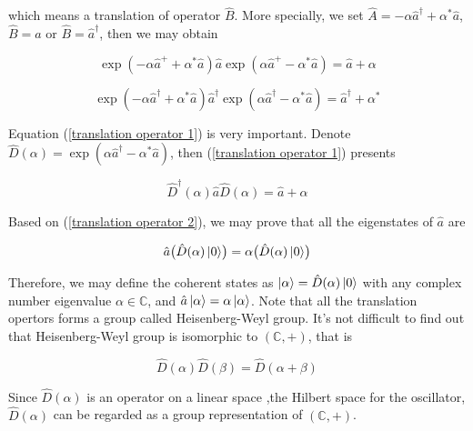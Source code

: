 \documentclass{article}
\begin{document}
        which means a translation of operator $\hat{B}$. More specially, we set $\hat{A}=-\alpha\hat{a}^\dagger+\alpha^*\hat{a}$, $\hat{B}=\hat{a}$ or $\hat{B}=\hat{a}^\dagger$, then we may obtain 

        \begin{equation}\label{translation operator 1}
            \exp(-\alpha\hat{a}^++\alpha^*\hat{a})\hat{a}\exp(\alpha\hat{a}^+-\alpha^*\hat{a}) = \hat{a}+\alpha
        \end{equation}

        \begin{equation}
            \exp(-\alpha\hat{a}^\dagger+\alpha^*\hat{a})\hat{a}^\dagger\exp(\alpha\hat{a}^\dagger-\alpha^*\hat{a}) = \hat{a}^\dagger+\alpha^*
        \end{equation}

        Equation (\ref{translation operator 1}) is very important. Denote $\hat{D}(\alpha)=\exp(\alpha\hat{a}^\dagger -\alpha^*\hat{a})$, then (\ref{translation operator 1}) presents

        \begin{equation}\label{translation operator 2}
            \hat{D}^\dagger(\alpha)\hat{a}\hat{D}(\alpha) = \hat{a} + \alpha
        \end{equation}

        Based on (\ref{translation operator 2}), we may prove that all the eigenstates of $\hat{a}$ are 

        \begin{equation}
            \hat{a} \bigl(\hat{D}(\alpha)\ket{0}\bigr) = \alpha \bigl(\hat{D}(\alpha)\ket{0}\bigr)
        \end{equation}

        Therefore, we may define the coherent states as $\ket{\alpha} = \hat{D}(\alpha)\ket{0}$ with any complex number eigenvalue $\alpha\in\mathbb{C}$, and $\hat{a}\ket{\alpha}=\alpha\ket{\alpha}$. Note that all the translation opertors forms a group called Heisenberg-Weyl group. It's not difficult to find out that Heisenberg-Weyl group is isomorphic to $(\mathbb{C}, +)$, that is 
        
        \begin{equation}        
            \hat{D}(\alpha)\hat{D}(\beta) = \hat{D}(\alpha+\beta)
        \end{equation}

        Since $\hat{D}(\alpha)$ is an operator on a linear space ,the Hilbert space for the oscillator, $\hat{D}(\alpha)$ can be regarded as a group representation of $(\mathbb{C}, +)$.
\end{document}
